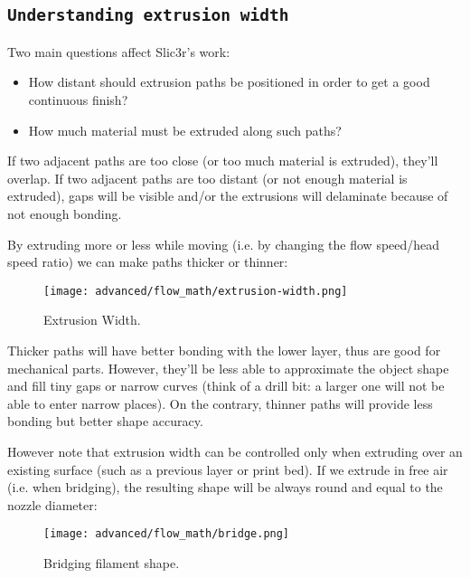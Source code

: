 
\subsection{\texttt{Understanding extrusion width}}
\label{sec:understanding_extrusion_width}

Two main questions affect Slic3r's work:
\begin{itemize}
\item How distant should extrusion paths be positioned in order to get a good continuous finish?
\item How much material must be extruded along such paths?
\end{itemize}

If two adjacent paths are too close (or too much material is extruded), they'll overlap. If two adjacent paths are too distant (or not enough material is extruded), gaps will be visible and/or the extrusions will delaminate because of not enough bonding.

By extruding more or less while moving (i.e. by changing the flow speed/head speed ratio) we can make paths thicker or thinner:

\begin{figure}[H]
\centering
\texttt{[image: advanced/flow\_math/extrusion-width.png]}
\caption{Extrusion Width.}
\label{fig:extrusion-width}
\end{figure}

Thicker paths will have better bonding with the lower layer, thus are good for mechanical parts. However, they'll be less able to approximate the object shape and fill tiny gaps or narrow curves (think of a drill bit: a larger one will not be able to enter narrow places). On the contrary, thinner paths will provide less bonding but better shape accuracy.

However note that extrusion width can be controlled only when extruding over an existing surface (such as a previous layer or print bed). If we extrude in free air (i.e. when bridging), the resulting shape will be always round and equal to the nozzle diameter:

\begin{figure}[H]
\centering
\texttt{[image: advanced/flow\_math/bridge.png]}
\caption{Bridging filament shape.}
\label{fig:bridge}
\end{figure}

